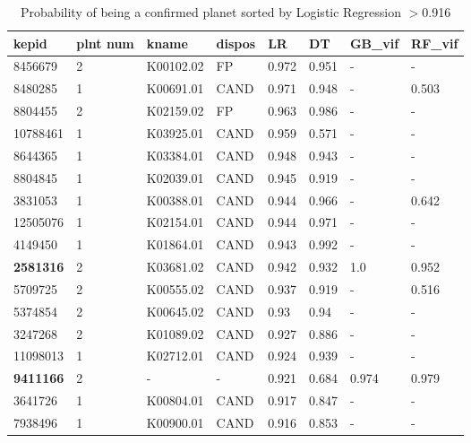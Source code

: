 \begin{table}[!htbp]
 \centering
 \caption{Probability of being a confirmed planet sorted by Logistic Regression $>$0.916}
 \label{dataLRDTGBvifRFviftab} 
  \begin{tabular}
{| 
 p{}| 
p{}| 
p{}| 
p{}| 
p{}| 
p{}| 
p{}| 
p{}| 
}\hline 
\textbf{kepid} &\textbf{plnt num} &\textbf{kname} &\textbf{dispos} &\textbf{LR} &\textbf{DT} &\textbf{GB\_vif} &\textbf{RF\_vif} \\ \hline 
8456679 &2 &K00102.02 &FP &0.972 &0.951 &- &- \\ \hline 
8480285 &1 &K00691.01 &CAND &0.971 &0.948 &- &0.503 \\ \hline 
8804455 &2 &K02159.02 &FP &0.963 &0.986 &- &- \\ \hline 
10788461 &1 &K03925.01 &CAND &0.959 &0.571 &- &- \\ \hline 
8644365 &1 &K03384.01 &CAND &0.948 &0.943 &- &- \\ \hline 
8804845 &1 &K02039.01 &CAND &0.945 &0.919 &- &- \\ \hline 
3831053 &1 &K00388.01 &CAND &0.944 &0.966 &- &0.642 \\ \hline 
12505076 &1 &K02154.01 &CAND &0.944 &0.971 &- &- \\ \hline 
4149450 &1 &K01864.01 &CAND &0.943 &0.992 &- &- \\ \hline 
\textbf{2581316} &2 &K03681.02 &CAND &0.942 &0.932 &1.0 &0.952 \\ \hline 
5709725 &2 &K00555.02 &CAND &0.937 &0.919 &- &0.516 \\ \hline 
5374854 &2 &K00645.02 &CAND &0.93 &0.94 &- &- \\ \hline 
3247268 &2 &K01089.02 &CAND &0.927 &0.886 &- &- \\ \hline 
11098013 &1 &K02712.01 &CAND &0.924 &0.939 &- &- \\ \hline 
\textbf{9411166} &2 &- &- &0.921 &0.684 &0.974 &0.979 \\ \hline 
3641726 &1 &K00804.01 &CAND &0.917 &0.847 &- &- \\ \hline 
7938496 &1 &K00900.01 &CAND &0.916 &0.853 &- &- \\ \hline 
\end{tabular} 
\end{table}
